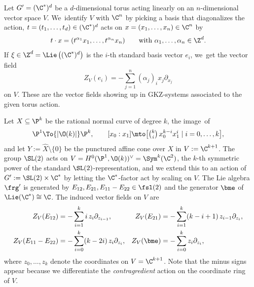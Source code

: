 \begin{exa}
Let $G' = (\C^*)^d$ be a $d$-dimensional torus acting linearly on an $n$\nobreakdash-dimen\-sion\-al vector space $V$. We~identify $V$ with $\C^n$ by picking a basis that diagonalizes the action, \ie $t = (t_1,\dots,t_d) \in (\C^*)^d$ acts on $x = (x_1,\dots,x_n) \in \C^n$ by
\[
t \cdot x = (t^{\alpha_1} x_1, \dots, t^{\alpha_n} x_n) \qquad \text{with }\alpha_1, \ldots, \alpha_n \in \Z^d.
\]
If $\xi \in \Z^d = \Lie\left((\C^*)^d\right)$ is the $i$-th standard basis vector $e_i$, we~get the vector field
\[
Z_V(e_i) = -\sum_{j=1}^n (\alpha_j)_i x_j \partial_{x_j}
\]
on $V$. These are the vector fields showing up in GKZ-systems associated to the given torus action.
\end{exa}

\begin{exa} \label{ex:P1VF}
Let $X \subseteq \P^k$ be the rational normal curve of degree $k$, \ie the image~of
\[
\P^1 \To{|\O(k)|} \P^k, \qquad [x_0:x_1] \mto \bigl[{\textstyle \binom{k}{i} \, x_0^{k-i} x_1^i \mid i = 0,\dots,k}\bigr],
\]
and let $Y := \hat X \setminus \{0\}$ be the punctured affine cone over $X$ in $V := \C^{k+1}$. The group $\SL(2)$ acts on $V = H^0(\P^1,\O(k))^\vee = \Sym^k (\C^2)$, the $k$-th symmetric power of the standard $\SL(2)$-representation, and we extend this to an action of $G' := \SL(2) \times \C^*$ by letting the $\C^*$-factor act by scaling on $V$.
The Lie algebra $\frg'$ is generated by $E_{12}, E_{21}, E_{11}-E_{22} \in \fsl(2)$ and the generator $\bme$ of $\Lie(\C^*) \cong \C$.
The induced vector fields on $V$ are
\begin{align*}
Z_V(E_{12}) &= -\sum_{i=1}^k i \, z_i \partial_{z_{i-1}},
&
Z_V(E_{21}) &= -\sum_{i=1}^k (k-i+1) \, z_{i-1} \partial_{z_i}, \\
Z_V(E_{11}-E_{22}) &= -\sum_{i=0}^k (k-2i) \, z_i \partial_{z_i},
&
Z_V(\bme) &= -\sum_{i=0}^k z_i \partial_{z_i},
\end{align*}
where $z_0,\dots,z_k$ denote the coordinates on $V = \C^{k+1}$. Note that the minus signs appear because we differentiate the \emph{contragredient} action on the coordinate ring of $V$.


\end{exa}
